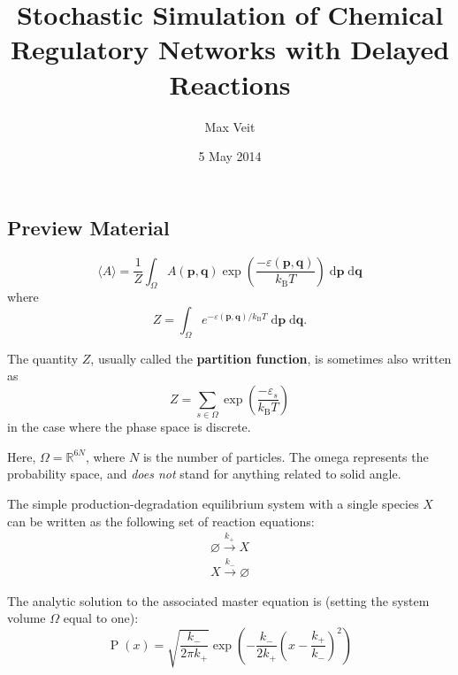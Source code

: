 \documentclass[english,letterpaper,12pt]{article}
\newcommand{\dee}{\;\mathrm{d}}
\renewcommand{\vec}[1]{\ensuremath{\mathbf{#1}}}
\DeclareMathOperator{\Prob}{P}
\newcommand{\kB}{\ensuremath{k_\mathrm{B}}}
\begin{document}
\title{Stochastic Simulation of Chemical Regulatory Networks with Delayed Reactions}
\author{Max Veit}
\date{5 May 2014}

\maketitle

\begin{doublespacing}

\setcounter{section}{-1}

\section{Preview Material} %
\label{sec:preview-material}


\lipsum[1-2]



\begin{equation}
    \langle A \rangle = \frac{1}{Z} \int_\Omega A(\vec{p}, \vec{q}) \exp\left(\frac{-\varepsilon(\vec{p}, \vec{q})}{\kB T}\right) \dee \vec{p} \dee \vec{q}
\end{equation}
where
\begin{equation}
    Z = \int_\Omega e^{-\varepsilon(\vec{p}, \vec{q}) / \kB T}\dee \vec{p} \dee \vec{q}.
\end{equation}

The quantity $Z$, usually called the \textbf{partition function}, is sometimes also written as
\begin{equation}
    Z = \sum_{s \in \Omega} \exp\left( \frac{-\varepsilon_s}{\kB T} \right)
    \label{eq:partfun-discrete}
\end{equation}
in the case where the phase space is discrete.

Here, $\Omega = \mathbb{R}^{6N}$, where $N$ is the number of particles. The omega represents the probability space, and \emph{does not} stand for anything related to solid angle.

The simple production-degradation equilibrium system with a single species $X$ can be written as the following set of reaction equations:
\begin{align}
    \varnothing \xrightarrow{k_+} X \\
    X \xrightarrow {k_-} \varnothing
    \label{eq:prod-deg-rxn}
\end{align}

The analytic solution to the associated master equation is (setting the system volume $\Omega$ equal to one):
\begin{equation}
    \Prob(x) = \sqrt{\frac{k_-}{2\pi k_+}}\exp\left( -\frac{k_-}{2k_+} \left( x - \frac{k_+}{k_-} \right)^2 \right)
    \label{eq:prod-deg-ans}
\end{equation}


\end{doublespacing}
\end{document}
